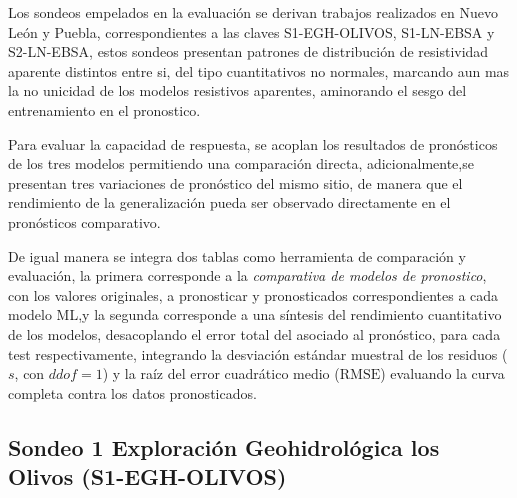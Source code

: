 	Los sondeos empelados en la evaluación se derivan trabajos realizados en Nuevo León y Puebla, correspondientes a las claves S1-EGH-OLIVOS, S1-LN-EBSA y S2-LN-EBSA, estos sondeos presentan patrones de distribución de resistividad aparente distintos entre si, del tipo cuantitativos no normales, marcando aun mas la no unicidad de los modelos resistivos aparentes, aminorando el sesgo del entrenamiento en el pronostico. 
	
	Para evaluar la capacidad de respuesta, se acoplan los resultados de pronósticos de los tres modelos permitiendo una comparación directa, adicionalmente,se presentan tres variaciones de pronóstico del mismo sitio, de manera que el rendimiento de la generalización pueda ser observado directamente en el pronósticos comparativo.
	
	De igual manera se integra dos tablas como herramienta de comparación y evaluación, la primera corresponde a la \textit{comparativa de modelos de pronostico}, con los valores originales, a pronosticar y pronosticados correspondientes a cada modelo ML,y la segunda corresponde a una síntesis del rendimiento cuantitativo de los modelos, desacoplando el error total del asociado al pronóstico, para cada test respectivamente, integrando la desviación estándar muestral de los residuos ($s$, con $ddof=1$) y la raíz del error cuadrático medio ($\mathrm{RMSE}$) evaluando la curva completa contra los datos pronosticados.
	
	
	
	
	
\clearpage
		\subsection{Sondeo 1 Exploración Geohidrológica los Olivos (S1-EGH-OLIVOS)} 
